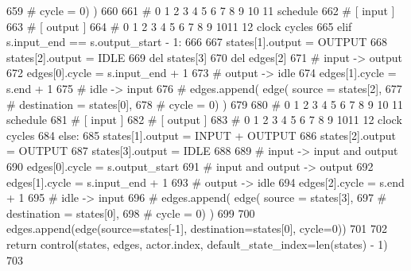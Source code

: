 \begin{DoxyCode}
659             \textcolor{comment}{#                     cycle = 0) )}
660 
661         \textcolor{comment}{#   0 1 2 3 4 5 6 7 8 9 10 11 schedule}
662         \textcolor{comment}{#   [ input  ]}
663         \textcolor{comment}{#             [ output ]}
664         \textcolor{comment}{# 0 1 2 3 4 5 6 7 8 9 1011 12 clock cycles}
665         \textcolor{keywordflow}{elif} s.input\_end == s.output\_start - 1:
666 
667             states[1].output = OUTPUT
668             states[2].output = IDLE
669             del states[3]
670             del edges[2]
671             \textcolor{comment}{# input -> output}
672             edges[0].cycle = s.input\_end + 1
673             \textcolor{comment}{# output -> idle}
674             edges[1].cycle = s.end + 1
675             \textcolor{comment}{# idle -> input}
676             \textcolor{comment}{# edges.append( edge( source = states[2],}
677             \textcolor{comment}{#                     destination = states[0],}
678             \textcolor{comment}{#                     cycle = 0) )}
679 
680         \textcolor{comment}{#   0 1 2 3 4 5 6 7 8 9 10 11 schedule}
681         \textcolor{comment}{#   [ input  ]}
682         \textcolor{comment}{#         [ output ]}
683         \textcolor{comment}{# 0 1 2 3 4 5 6 7 8 9 1011 12 clock cycles}
684         \textcolor{keywordflow}{else}:
685             states[1].output = INPUT + OUTPUT
686             states[2].output = OUTPUT
687             states[3].output = IDLE
688 
689             \textcolor{comment}{# input -> input and output}
690             edges[0].cycle = s.output\_start
691             \textcolor{comment}{# input and output -> output}
692             edges[1].cycle = s.input\_end + 1
693             \textcolor{comment}{# output -> idle}
694             edges[2].cycle = s.end + 1
695             \textcolor{comment}{# idle -> input}
696             \textcolor{comment}{# edges.append( edge( source = states[3],}
697             \textcolor{comment}{#                     destination = states[0],}
698             \textcolor{comment}{#                     cycle = 0) )}
699 
700         edges.append(edge(source=states[-1], destination=states[0], cycle=0))
701 
702         \textcolor{keywordflow}{return} control(states, edges, actor.index, default\_state\_index=len(states) - 1)
703 
\end{DoxyCode}
\mbox{\label{namespacesylva_1_1glic_1_1glic_a0b179ee41ee4494cf7450be4ca272db4}} 
